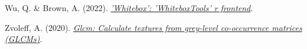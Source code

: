 \documentclass[
]{article}
\newlength{\cslhangindent}
\newlength{\cslentryspacingunit} %
\newenvironment{CSLReferences}[2] %
 {%
  \setlength{\parindent}{0pt}
  \ifodd #1
  \let\oldpar\par
  \def\par{\hangindent=\cslhangindent\oldpar}
  \fi
  \setlength{\parskip}{#2\cslentryspacingunit}
 }%
 {}
\begin{document}
\begin{CSLReferences}{1}{0}
\leavevmode{}%
Wu, Q. \& Brown, A. (2022).
\emph{\href{https://CRAN.R-project.org/package=whitebox}{'Whitebox':
'WhiteboxTools' r frontend}}.

\leavevmode{}%
Zvoleff, A. (2020).
\emph{\href{https://CRAN.R-project.org/package=glcm}{Glcm: Calculate
textures from grey-level co-occurrence matrices (GLCMs)}}.

\end{CSLReferences}
\end{document}
